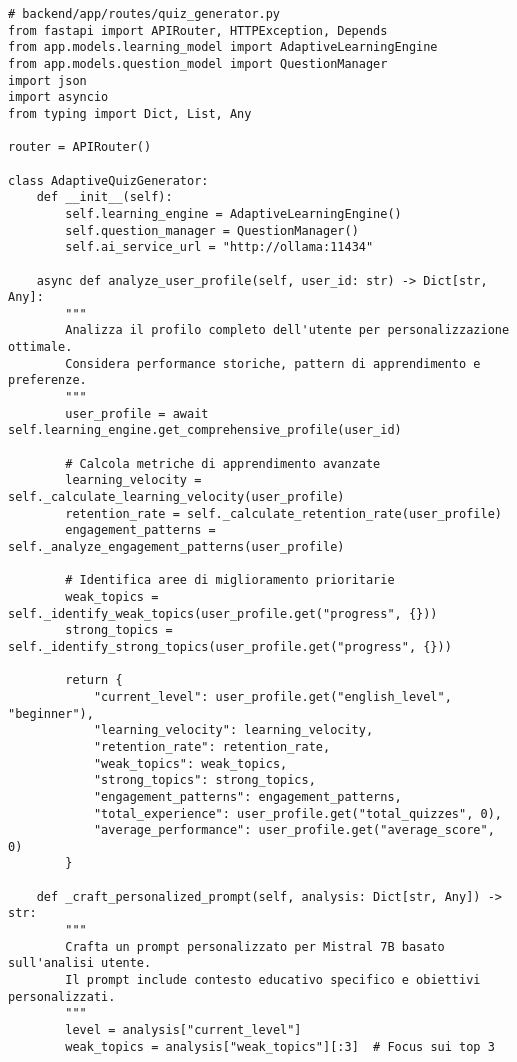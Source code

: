 \documentclass[a4paper, 14pt, oneside]{extbook}
\begin{document}
\begin{lstlisting}[style=pythonstyle, caption=Generatore Quiz Adattivo - Logica Avanzata, label=lst:adaptive-quiz]
# backend/app/routes/quiz_generator.py
from fastapi import APIRouter, HTTPException, Depends
from app.models.learning_model import AdaptiveLearningEngine
from app.models.question_model import QuestionManager
import json
import asyncio
from typing import Dict, List, Any

router = APIRouter()

class AdaptiveQuizGenerator:
    def __init__(self):
        self.learning_engine = AdaptiveLearningEngine()
        self.question_manager = QuestionManager()
        self.ai_service_url = "http://ollama:11434"
        
    async def analyze_user_profile(self, user_id: str) -> Dict[str, Any]:
        """
        Analizza il profilo completo dell'utente per personalizzazione ottimale.
        Considera performance storiche, pattern di apprendimento e preferenze.
        """
        user_profile = await self.learning_engine.get_comprehensive_profile(user_id)
        
        # Calcola metriche di apprendimento avanzate
        learning_velocity = self._calculate_learning_velocity(user_profile)
        retention_rate = self._calculate_retention_rate(user_profile)
        engagement_patterns = self._analyze_engagement_patterns(user_profile)
        
        # Identifica aree di miglioramento prioritarie
        weak_topics = self._identify_weak_topics(user_profile.get("progress", {}))
        strong_topics = self._identify_strong_topics(user_profile.get("progress", {}))
        
        return {
            "current_level": user_profile.get("english_level", "beginner"),
            "learning_velocity": learning_velocity,
            "retention_rate": retention_rate,
            "weak_topics": weak_topics,
            "strong_topics": strong_topics,
            "engagement_patterns": engagement_patterns,
            "total_experience": user_profile.get("total_quizzes", 0),
            "average_performance": user_profile.get("average_score", 0)
        }
    
    def _craft_personalized_prompt(self, analysis: Dict[str, Any]) -> str:
        """
        Crafta un prompt personalizzato per Mistral 7B basato sull'analisi utente.
        Il prompt include contesto educativo specifico e obiettivi personalizzati.
        """
        level = analysis["current_level"]
        weak_topics = analysis["weak_topics"][:3]  # Focus sui top 3
        

\end{lstlisting}
\end{document}
